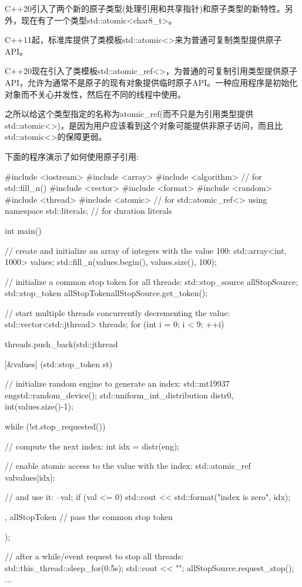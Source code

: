 

C++20引入了两个新的原子类型(处理引用和共享指针)和原子类型的新特性。另外，现在有了一个类型std::atomic<char8\_t>。


C++11起，标准库提供了类模板std::atomic<>来为普通可复制类型提供原子API。

C++20现在引入了类模板std::atomic\_ref<>，为普通的可复制引用类型提供原子API，允许为通常不是原子的现有对象提供临时原子API。一种应用程序是初始化对象而不关心并发性，然后在不同的线程中使用。

之所以给这个类型指定的名称为atomic\_ref(而不只是为引用类型提供std::atomic<>)，是因为用户应该看到这个对象可能提供非原子访问，而且比std::atomic<>的保障更弱。


下面的程序演示了如何使用原子引用:


\begin{cpp}
#include <iostream>
#include <array>
#include <algorithm> // for std::fill_n()
#include <vector>
#include <format>
#include <random>
#include <thread>
#include <atomic> // for std::atomic_ref<>
using namespace std::literals; // for duration literals

int main()
{
	// create and initialize an array of integers with the value 100:
	std::array<int, 1000> values;
	std::fill_n(values.begin(), values.size(), 100);

	// initialize a common stop token for all threads:
	std::stop_source allStopSource;
	std::stop_token allStopToken{allStopSource.get_token()};

	// start multiple threads concurrently decrementing the value:
	std::vector<std::jthread> threads;
	for (int i = 0; i < 9; ++i) {
		threads.push_back(std::jthread{
			[&values] (std::stop_token st) {
				// initialize random engine to generate an index:
				std::mt19937 eng{std::random_device{}()};
				std::uniform_int_distribution distr{0, int(values.size()-1)};

				while (!st.stop_requested()) {
					// compute the next index:
					int idx = distr(eng);

					// enable atomic access to the value with the index:
					std::atomic_ref val{values[idx]};

					// and use it:
					--val;
					if (val <= 0) {
						std::cout << std::format("index {} is zero\n", idx);
					}
				}
			},
			allStopToken // pass the common stop token
		});
	}

	// after a while/event request to stop all threads:
	std::this_thread::sleep_for(0.5s);
	std::cout << "\nSTOP\n";
	allStopSource.request_stop();
	...
}
\end{cpp}

